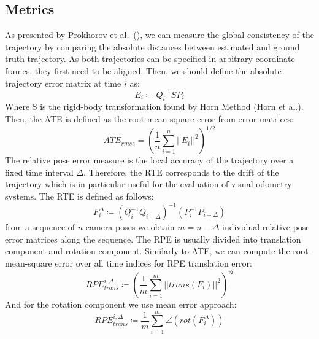 \subsection{Metrics}\label{subsec:ate-and-rte}
As presented by Prokhorov et al.~(\cite{measuring_robustness_of_visual_slam}), we can measure the global consistency of the trajectory by comparing the absolute distances between estimated and ground truth trajectory.
As both trajectories can be specified in arbitrary coordinate frames, they first need to be aligned.
Then, we should define the absolute trajectory error matrix at time $i$ as:
\begin{equation}
    \label{eq:ate-error-matrix}
    E_i \coloneq Q_i^{-1} SP_i
\end{equation}
Where S is the rigid-body transformation found by Horn Method (Horn et al.\cite{horn_method}).
Then, the ATE is defined as the root-mean-square error from error matrices:
\begin{equation}
    ATE_{rmse} = (\frac{1}{n} \sum_{i=1}^{n} ||E_i||^2)^{1/2}
    \label{eq:ate-rmse}
\end{equation}
The relative pose error measure is the local accuracy of the trajectory over a fixed time interval $\Delta$.
Therefore, the RTE corresponds to the drift of the trajectory which is in particular useful for the evaluation of visual odometry systems.
The RTE is defined as follows:
\begin{equation}
    F_i^{\Delta} \coloneq (Q_i^{-1} Q_{i+\Delta})^{-1} (P_i^{-1} P_{i+\Delta})
    \label{eq:rte}
\end{equation}
from a sequence of $n$ camera poses we obtain  $m = n - \Delta$ individual relative pose error matrices along the sequence.
The RPE is usually divided into translation component and rotation component.
Similarly to ATE, we can compute the root-mean-square error over all time indices for RPE translation error:
\begin{equation}
    RPE_{trans}^{i, \Delta} \coloneq (\frac{1}{m} \sum_{i=1}^m ||trans(F_i)||^2)^{½}
    \label{eq:rpe-trans}
\end{equation}
And for the rotation component we use mean error approach:
\begin{equation}
    RPE_{trans}^{i, \Delta} \coloneq \frac{1}{m} \sum_{i=1}^m \angle (rot(F_i^\Delta))
    \label{eq:equation-rpe-trans}
\end{equation}